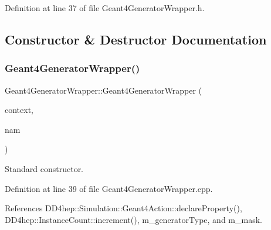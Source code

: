 Definition at line 37 of file Geant4\+Generator\+Wrapper.\+h.



\subsection{Constructor \& Destructor Documentation}
\hypertarget{class_d_d4hep_1_1_simulation_1_1_geant4_generator_wrapper_add52b72c8a305745d95bddd0a6d0c5f4}{}\label{class_d_d4hep_1_1_simulation_1_1_geant4_generator_wrapper_add52b72c8a305745d95bddd0a6d0c5f4} 
\subsubsection{\texorpdfstring{Geant4\+Generator\+Wrapper()}{Geant4GeneratorWrapper()}}
{\footnotesize\ttfamily Geant4\+Generator\+Wrapper\+::\+Geant4\+Generator\+Wrapper (\begin{DoxyParamCaption}\item[{\hyperlink{class_d_d4hep_1_1_simulation_1_1_geant4_context}{Geant4\+Context} $\ast$}]{context,  }\item[{const std\+::string \&}]{nam }\end{DoxyParamCaption})}



Standard constructor. 



Definition at line 39 of file Geant4\+Generator\+Wrapper.\+cpp.



References D\+D4hep\+::\+Simulation\+::\+Geant4\+Action\+::declare\+Property(), D\+D4hep\+::\+Instance\+Count\+::increment(), m\+\_\+generator\+Type, and m\+\_\+mask.

\hypertarget{class_d_d4hep_1_1_simulation_1_1_geant4_generator_wrapper_a6b3f7695a18e97d4aed0f414368ff84a}{}\label{class_d_d4hep_1_1_simulation_1_1_geant4_generator_wrapper_a6b3f7695a18e97d4aed0f414368ff84a} 
